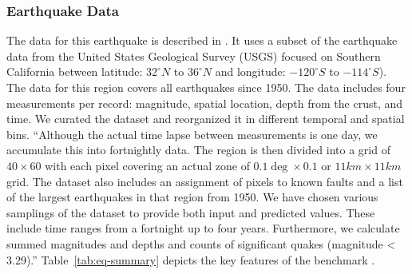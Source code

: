 \documentclass[utf8]{FrontiersinVancouver} %
\begin{document}
\subsubsection{Earthquake Data}

The data for this earthquake is described in \citep{las-22-mlcommons-science}.  It uses a subset of the earthquake data from the United States Geological Survey (USGS) focused on Southern California between latitude: $32^\circ N$ to $36^\circ N$ and longitude: $-120^\circ S$ to $-114^\circ S$). The data for this region covers all earthquakes since 1950. The data includes four measurements per record: magnitude, spatial location, depth from the crust, and time. We curated the dataset and reorganized it in different temporal and spatial bins. ``Although the actual time lapse between measurements is one day, we accumulate this into fortnightly data. The region is then divided into a grid of $40 \times 60$ with each pixel covering an actual zone of $0.1\deg \times 0.1$ or $11km \times 11km$ grid. The dataset also includes an assignment of pixels to known faults and a list of the largest earthquakes in that region from 1950. We have chosen various samplings of the dataset to provide both input and predicted values. These include time ranges from a fortnight up to four years. Furthermore, we calculate summed magnitudes and depths and counts of significant quakes (magnitude < 3.29).''  Table~\ref{tab:eq-summary} depicts the key features of the benchmark \citep{las-22-mlcommons-science}.
\end{document}
